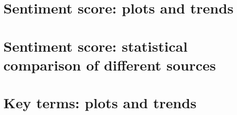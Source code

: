 \documentclass{report}
\begin{document}


\section{Sentiment score: plots and trends} \label{Sentiment score: plots and trends}

\section{Sentiment score: statistical comparison of different sources} \label{Sentiment score: statistical comparison of different sources}


% 

\section{Key terms: plots and trends} \label{Key terms: plots and trends}




\end{document}
